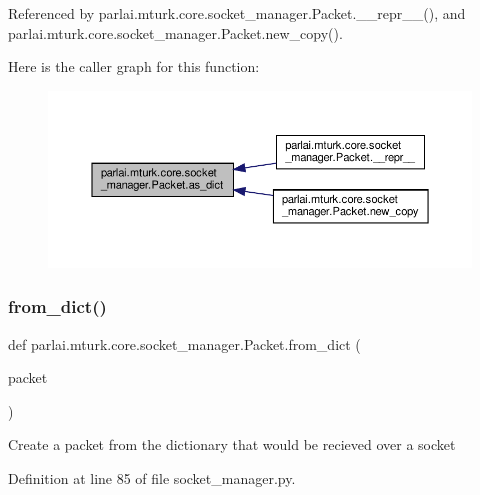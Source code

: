 Referenced by parlai.\+mturk.\+core.\+socket\+\_\+manager.\+Packet.\+\_\+\+\_\+repr\+\_\+\+\_\+(), and parlai.\+mturk.\+core.\+socket\+\_\+manager.\+Packet.\+new\+\_\+copy().

Here is the caller graph for this function\+:
\nopagebreak
\begin{figure}[H]
\begin{center}
\leavevmode
\includegraphics[width=350pt]{classparlai_1_1mturk_1_1core_1_1socket__manager_1_1Packet_a805fbc99169620a4a3c37a7892b5fab3_icgraph}
\end{center}
\end{figure}
\mbox{\label{classparlai_1_1mturk_1_1core_1_1socket__manager_1_1Packet_aa186d3b3ba07b6c2eba5e241cbaf92f8}} 
\subsubsection{\texorpdfstring{from\+\_\+dict()}{from\_dict()}}
{\footnotesize\ttfamily def parlai.\+mturk.\+core.\+socket\+\_\+manager.\+Packet.\+from\+\_\+dict (\begin{DoxyParamCaption}\item[{}]{packet }\end{DoxyParamCaption})\hspace{0.3cm}{\ttfamily [static]}}

\begin{DoxyVerb}Create a packet from the dictionary that would
be recieved over a socket
\end{DoxyVerb}
 

Definition at line 85 of file socket\+\_\+manager.\+py.



